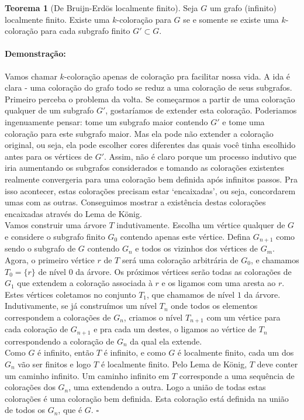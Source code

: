 \documentclass[11pt]{article}
\newcommand{\pulinho}{\vspace{.5cm}}
\theoremstyle{definition}
\newtheorem{theorem}{Teorema}
\newenvironment{teorema}{
\definecolor{shadecolor}{HTML}{f59aa3}
\begin{shaded}
\begin{theorem}
}
{
\end{theorem}
\end{shaded}
}
\theoremstyle{definition}
\theoremstyle{definition}
\theoremstyle{definition}
\theoremstyle{definition}
\theoremstyle{definition}
\theoremstyle{definition}
\theoremstyle{definition}
\theoremstyle{definition}
\theoremstyle{definition}
\theoremstyle{definition}
\theoremstyle{definition}
\newenvironment{prova}{\paragraph{Demonstração:}}{\hfill$\square$ 
\pulinho
}
\theoremstyle{definition}
\begin{document}
\begin{teorema}[De Bruijn-Erdös localmente finito]
  Seja $G$ um grafo (infinito) localmente finito. Existe uma $k$-coloração para $G$ se e somente se existe uma $k$-coloração para cada subgrafo finito $G' \subset G$.
\end{teorema}
\begin{prova}
  Vamos chamar $k$-coloração apenas de coloração pra facilitar nossa vida. A ida é clara - uma coloração do grafo todo se reduz a uma coloração de seus subgrafos. Primeiro perceba o problema da volta. Se começarmos a partir de uma coloração qualquer de um subgrafo $G'$, gostaríamos de extender esta coloração. Poderiamos ingenuamente pensar: tome um subgrafo maior contendo $G'$ e tome uma coloração para este subgrafo maior. Mas ela pode não extender a coloração original, ou seja, ela pode escolher cores diferentes das quais você tinha escolhido antes para os vértices de $G'$. Assim, não é claro porque um processo indutivo que iria aumentando os subgrafos considerados e tomando as colorações existentes realmente convergeria para uma coloração bem definida após infinitos passos. Pra isso acontecer, estas colorações precisam estar `encaixadas', ou seja, concordarem umas com as outras. Conseguimos mostrar a existência destas colorações encaixadas através do Lema de König.\\

  Vamos construir uma árvore $T$ indutivamente. Escolha um vértice qualquer de $G$ e considere o subgrafo finito $G_0$ contendo apenas este vértice. Defina $G_{n+1}$ como sendo o subgrafo de $G$ contendo $G_n$ e todos os vizinhos dos vértices de $G_m$. Agora, o primeiro vértice $r$ de $T$ será uma coloração arbitrária de $G_0$, e chamamos $T_0 = \{r\}$ de nível $0$ da árvore. Os próximos vértices serão todas as colorações de $G_1$ que extendem a coloração associada à $r$ e os ligamos com uma aresta ao $r$. Estes vértices coletamos no conjunto $T_1$, que chamamos de nível $1$ da árvore. Indutivamente, se já construímos um nível $T_n$ onde todos os elementos correspondem a colorações de $G_n$, criamos o nível $T_{n+1}$ com um vértice para cada coloração de $G_{n+1}$ e pra cada um destes, o ligamos ao vértice de $T_n$ correspondendo a coloração de $G_n$ da qual ela extende.\\

  Como $G$ é infinito, então $T$ é infinito, e como $G$ é localmente finito, cada um dos $G_n$ vão ser finitos e logo $T$ é localmente finito. Pelo Lema de König, $T$ deve conter um caminho infinito. Um caminho infinito em $T$ corresponde a uma sequência de colorações dos $G_n$, uma extendendo a outra. Logo a união de todas estas colorações é uma coloração bem definida. Esta coloração está definida na união de todos os $G_n$, que é $G$.
\end{prova}
\end{document}
